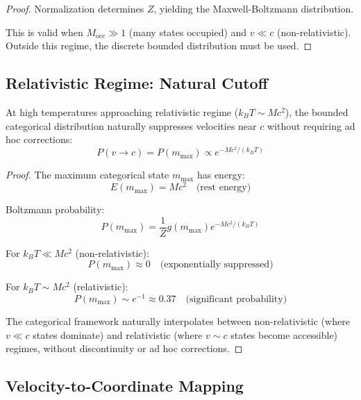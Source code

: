 \begin{definition}
\begin{proof}
Normalization determines $Z$, yielding the Maxwell-Boltzmann distribution.

This is valid when $M_{\text{occ}} \gg 1$ (many states occupied) and $v \ll c$ (non-relativistic). Outside this regime, the discrete bounded distribution must be used.
\end{proof}

\subsection{Relativistic Regime: Natural Cutoff}

\begin{proposition}
\label{prop:relativistic_suppression}
At high temperatures approaching relativistic regime ($k_BT \sim Mc^2$), the bounded categorical distribution naturally suppresses velocities near $c$ without requiring ad hoc corrections:
\begin{equation}
P(v \to c) = P(m_{\max}) \propto e^{-Mc^2/(k_BT)}
\end{equation}
\end{proposition}

\begin{proof}
The maximum categorical state $m_{\max}$ has energy:
\begin{equation}
E(m_{\max}) = Mc^2 \quad \text{(rest energy)}
\end{equation}

Boltzmann probability:
\begin{equation}
P(m_{\max}) = \frac{1}{Z} g(m_{\max}) e^{-Mc^2/(k_BT)}
\end{equation}

For $k_BT \ll Mc^2$ (non-relativistic):
\begin{equation}
P(m_{\max}) \approx 0 \quad \text{(exponentially suppressed)}
\end{equation}

For $k_BT \sim Mc^2$ (relativistic):
\begin{equation}
P(m_{\max}) \sim e^{-1} \approx 0.37 \quad \text{(significant probability)}
\end{equation}

The categorical framework naturally interpolates between non-relativistic (where $v \ll c$ states dominate) and relativistic (where $v \sim c$ states become accessible) regimes, without discontinuity or ad hoc corrections.
\end{proof}

\subsection{Velocity-to-Coordinate Mapping}


\end{definition}
